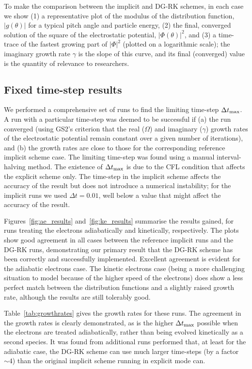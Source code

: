 \documentclass[10pt,a4paper]{article}
\begin{document}
To make the comparison between the implicit and DG-RK schemes, in each case we
show (1) a representative plot of the modulus of the distribution function,
$|g(\theta)|$ for a typical pitch angle and particle energy, (2) the final,
converged solution of the square of the electrostatic potential,
$|\Phi(\theta)|^2$, and (3) a time-trace of the fastest growing part of
$|\Phi|^2$ (plotted on a logarithmic scale); the imaginary growth rate
$\gamma$ is the slope of this curve, and its final (converged) value is the
quantity of relevance to researchers.

\subsection{Fixed time-step results}

We performed a comprehensive set of runs to find the limiting time-step
$\Delta t_{\mbox{\scriptsize max}}$. A run with a particular time-step was
deemed to be successful if (a) the run converged (using GS2's criterion that
the real ($\Omega$) and imaginary ($\gamma$) growth rates of the electrostatic
potential remain constant over a given number of iterations), and (b) the
growth rates are close to those for the corresponding reference implicit
scheme case. The limiting time-step was found using a manual interval-halving
method. The existence of $\Delta t_{\mbox{\scriptsize max}}$ is due to the CFL
condition that affects the explicit scheme only. The time-step in the implicit
scheme affects the accuracy of the result but does not introduce a numerical
instability; for the implicit runs we used $\Delta t = 0.01$, well below a
value that might affect the accuracy of the result.

Figures~\ref{fig:ae_results} and~\ref{fig:ke_results} summarise the results
gained, for runs treating the electrons adiabatically and kinetically,
respectively. The plots show good agreement in all cases between the reference
implicit runs and the DG-RK runs, demonstrating our primary result that the
DG-RK scheme has been correctly and successfully implemented. Excellent
agreement is evident for the adiabatic electrons case. The kinetic
electrons case (being a more challenging situation to model because of the
higher speed of the electrons) does show a less perfect match between the
distribution functions and a slightly raised growth rate, although the results
are still tolerably good.

Table~\ref{tab:growthrates} gives the growth rates for these runs. The
agreement in the growth rates is clearly demonstrated, as is the higher
$\Delta t_{\mbox{\scriptsize max}}$ possible when the electrons are treated
adiabatically, rather than being evolved kinetically as a second species. It
was found from additional runs performed that, at least for the adiabatic
case, the DG-RK scheme can use much larger time-steps (by a factor $\sim 4$)
than the original implicit scheme running in explicit mode can.
\end{document}
